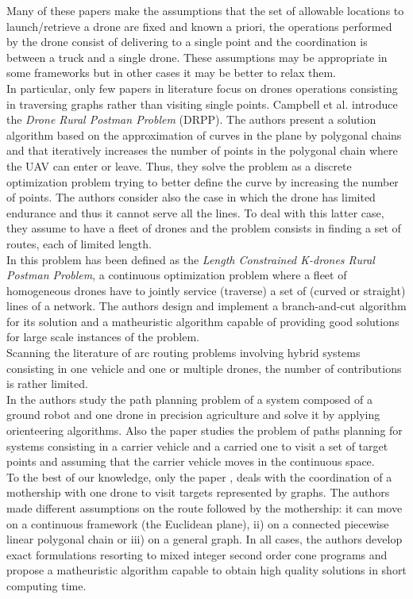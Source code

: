 Many of these papers make the assumptions that the set of allowable locations to launch/retrieve a drone are fixed and known a priori, the operations performed by the drone consist of delivering to a single point and the coordination is between a truck and a single drone. These assumptions may be appropriate in some frameworks but in other cases it may be better to relax them.\\
\noindent
In particular, only few papers in literature focus on drones operations consisting in traversing graphs rather than visiting single points. Campbell et al. 
\cite{art:Campbell2018} introduce the \textit{Drone Rural Postman Problem} (DRPP). The authors present a solution algorithm based on the approximation of curves in the plane by polygonal chains and that iteratively increases the number of points in the polygonal chain where the UAV can enter or leave. Thus, they solve the problem as a discrete optimization problem trying to better define the curve by increasing the number of points. The authors consider also the case in which the drone has limited endurance and thus it cannot serve all the lines. To deal with this latter case, they assume to have a fleet of drones and the problem consists in finding a set of routes, each of limited length.\\
In \cite{art:CAMPBELL202160}  this problem has been defined as the \textit{Length Constrained K-drones Rural Postman Problem}, a continuous optimization problem where a fleet of homogeneous drones have to jointly service (traverse) a set of (curved or straight) lines of a network. The authors design and implement a branch-and-cut algorithm for its solution and a matheuristic algorithm capable of providing good solutions for large scale instances of the problem.\\
Scanning the literature of arc routing problems involving hybrid systems consisting in one vehicle and one or multiple drones, the number of contributions is rather limited.\\
In \cite{art:Tokekar2016} the authors study the path planning problem of a system composed of a ground robot and one drone in precision agriculture and solve it by applying orienteering algorithms. Also the paper \cite{art:Garone2010} studies the problem of paths planning for systems consisting in a carrier vehicle and a carried one to visit a set of target points and assuming that the carrier vehicle moves in the continuous space.\\
To the best of our knowledge, only the paper \cite{art:Amorosi2021}, deals with the coordination of a mothership with one drone to visit targets represented by graphs. The authors made different assumptions on the route followed by the mothership: it can move on a continuous framework (the Euclidean plane), ii) on a connected piecewise linear polygonal chain or iii) on a general graph. In all cases, the authors develop exact formulations resorting to mixed integer second order cone programs and propose a matheuristic algorithm capable to obtain high quality solutions in short computing time.
